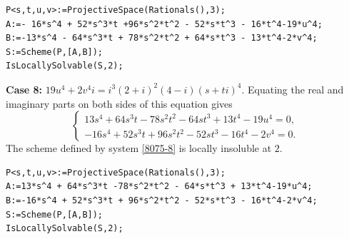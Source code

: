 \documentclass[a4paper,12pt,english,reqno]{amsart}
\begin{document}

\begin{lstlisting}
P<s,t,u,v>:=ProjectiveSpace(Rationals(),3);
A:=- 16*s^4 + 52*s^3*t +96*s^2*t^2 - 52*s*t^3 - 16*t^4-19*u^4;
B:=-13*s^4 - 64*s^3*t + 78*s^2*t^2 + 64*s*t^3 - 13*t^4-2*v^4;
S:=Scheme(P,[A,B]);
IsLocallySolvable(S,2);
\end{lstlisting}


{\bf Case 8:} $19u^4+2v^4i=i^3(2+i)^2(4-i)(s+ti)^4$.  Equating the real and imaginary parts on both sides of this equation gives
\begin{equation}\label{8075-8}
\begin{cases}
13s^4 + 64s^3t - 78s^2t^2 - 64st^3 + 13t^4 - 19u^4=0,\\
-16s^4 + 52s^3t + 96s^2t^2 - 52st^3 - 16t^4 - 2v^4=0.
\end{cases}
\end{equation}
The scheme defined by system \eqref{8075-8} is locally insoluble at $2$.


\begin{lstlisting}
P<s,t,u,v>:=ProjectiveSpace(Rationals(),3);
A:=13*s^4 + 64*s^3*t -78*s^2*t^2 - 64*s*t^3 + 13*t^4-19*u^4;
B:=-16*s^4 + 52*s^3*t + 96*s^2*t^2 - 52*s*t^3 - 16*t^4-2*v^4;
S:=Scheme(P,[A,B]);
IsLocallySolvable(S,2);
\end{lstlisting}
\end{document}
